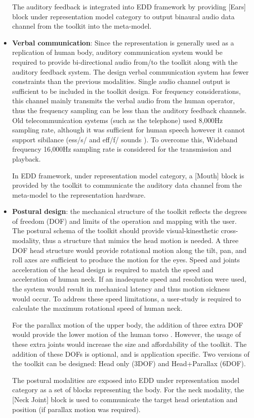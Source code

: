 \begin{itemize}
The auditory feedback is integrated into EDD framework by providing [Ears] block under representation model category to output binaural audio data channel from the toolkit into the meta-model. 

\item \textbf{Verbal communication}: Since the representation is generally used as a replication of human body, auditory communication system would be required to provide bi-directional audio from/to the toolkit along with the auditory feedback system. The design verbal communication system has fewer constraints than the previous modalities. Single audio channel output is sufficient to be included in the toolkit design. For frequency considerations, this channel mainly transmits the verbal audio from the human operator, thus the frequency sampling can be less than the auditory feedback channels. Old telecommunication systems (such as the telephone) used 8,000Hz sampling rate, although it was sufficient for human speech however it cannot support sibilance (ess/s/ and eff/f/ sounds ). To overcome this, Wideband frequency 16,000Hz sampling rate is considered for the transmission and playback.

In EDD framework, under representation model category, a [Mouth] block is provided by the toolkit to communicate the auditory data channel from the meta-model to the representation hardware. 

\item \textbf{Postural design}: the mechanical structure of the toolkit reflects the degrees of freedom (DOF) and limits of the operation and mapping with the user. The postural schema of the toolkit should provide visual-kinesthetic cross-modality, thus a structure that mimics the head motion is needed. A three DOF head structure would provide rotational motion along the tilt, pan, and roll axes are sufficient to produce the motion for the eyes. Speed and joints acceleration of the head design is required to match the speed and acceleration of human neck. If an inadequate speed and resolution were used, the system would result in mechanical latency and thus motion sickness would occur. To address these speed limitations, a user-study is required to calculate the maximum rotational speed of human neck. 

For the parallax motion of the upper body, the addition of three extra DOF would provide the lower motion of the human torso \cite{watanabe2008torso}. However, the usage of these extra joints would increase the size and affordability of the toolkit. The addition of these DOFs is optional, and is application specific. Two versions of the toolkit can be designed: Head only (3DOF) and Head+Parallax (6DOF).

The postural modalities are exposed into EDD under representation model category as a set of blocks representing the body. For the neck modality, the [Neck Joint] block is used to communicate the target head orientation and position (if parallax motion was required).

\end{itemize}

